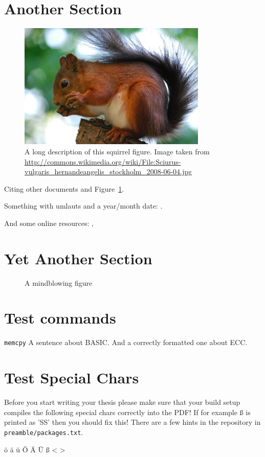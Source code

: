 \section{Another Section}

\begin{figure}[tbp]
    \centering
    \includegraphics[width=0.8\textwidth]{images/squirrel}
    \caption[Short description]{A long description of this squirrel figure.
    Image taken from
    \url{http://commons.wikimedia.org/wiki/File:Sciurus-vulgaris_hernandeangelis_stockholm_2008-06-04.jpg}}
    \label{fig:squirrel}
\end{figure}

Citing \cite{bellard2005qfa} other documents \cite{bellard2005qfa, boileau06}
and Figure~\ref{fig:squirrel}.

Something with umlauts and a year/month date:
\cite{becher04:_feurig_hacken_mit_firew}.

And some online resources: \cite{green04}, \cite{patent:4819234}


\section{Yet Another Section}


\begin{figure}[tbp]
    \caption{A mindblowing figure}
    \label{fig:todo}
\end{figure}

\section{Test commands}

\drops \LLinux \NOVA \QEMU
\texttt{memcpy}
A sentence about BASIC. And a correctly formatted one about ECC\@.

\section{Test Special Chars}
Before you start writing your thesis please make sure that your build setup
compiles the following special chars correctly into the PDF!
If for example ß is printed as 'SS' then you should fix this!
There are a few hints in the repository in \mbox{\texttt{preamble/packages.txt}}.

ö ä ü Ö Ä Ü ß < >


\cleardoublepage


